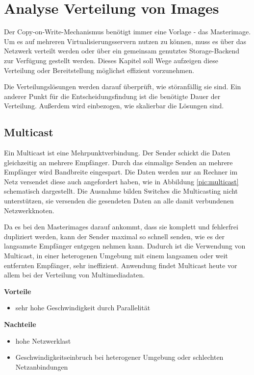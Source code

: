 \chapter{Analyse Verteilung von Images}
Der Copy-on-Write-Mechanismus benötigt immer eine Vorlage - das Masterimage. Um es auf mehreren Virtualisierungsservern nutzen zu können, muss es über das Netzwerk verteilt werden oder über ein gemeinsam genutztes Storage-Backend zur Verfügung gestellt werden. Dieses Kapitel soll Wege aufzeigen diese Verteilung oder Bereitstellung möglichst effizient vorzunehmen.

Die Verteilungslösungen werden darauf überprüft, wie störanfällig sie sind. Ein anderer Punkt für die Entscheidungsfindung ist die benötigte Dauer der Verteilung. Außerdem wird einbezogen, wie skalierbar die Lösungen sind.

\section{Multicast}
Ein Multicast ist eine Mehrpunktverbindung. Der Sender schickt die Daten gleichzeitig an mehrere Empfänger. Durch das einmalige Senden an mehrere Empfänger wird Bandbreite eingespart. Die Daten werden nur an Rechner im Netz versendet diese auch angefordert haben, wie in Abbildung \ref{pic:multicast} schematisch dargestellt. Die Ausnahme bilden Switches die Multicasting nicht unterstützen, sie versenden die gesendeten Daten an alle damit verbundenen Netzwerkknoten. 

Da es bei den Masterimages darauf ankommt, dass sie komplett und fehlerfrei dupliziert werden, kann der Sender maximal so schnell senden, wie es der langsamste Empfänger entgegen nehmen kann.  Dadurch ist die Verwendung von Multicast, in einer heterogenen Umgebung mit einem langsamen oder weit entfernten Empfänger, sehr ineffizient. Anwendung findet Multicast heute vor allem bei der Verteilung von Multimediadaten. 


\textbf{Vorteile}
\begin{itemize}
 \item sehr hohe Geschwindigkeit durch Parallelität
\end{itemize}

\textbf{Nachteile}
\begin{itemize}
 \item hohe Netzwerklast
 \item Geschwindigkeitseinbruch bei heterogener Umgebung oder schlechten Netzanbindungen
\end{itemize}


